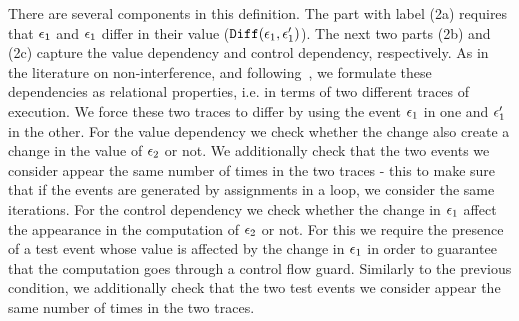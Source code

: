 There are several components in this definition. The part with label (2a) requires that $\mathtt{\epsilon}_1$ and $\mathtt{\epsilon}_1$ differ in their value ($\mathtt{Diff}(\mathtt{\epsilon}_1, \mathtt{\epsilon}_1')$).
The next two parts (2b) and (2c) capture the value dependency and control dependency, respectively.
As in the literature on non-interference, and following~\cite{Cousot19a}, we formulate these dependencies as relational properties, i.e. in terms of two different traces of execution. 
We force these two traces to differ by using the event $\mathtt{\epsilon}_1$ in one and $\mathtt{\epsilon}_1'$ in the other. 
For the value dependency we check whether the change also create a change in the value of $\mathtt{\epsilon}_2$ or not. We additionally check that the two events we consider appear the same number of times in the two traces - this to make sure that if the events are generated by assignments in a loop, we consider the same iterations. 
For the control dependency we check whether the change in $\mathtt{\epsilon}_1$ affect the appearance in the computation of $\mathtt{\epsilon}_2$ or not. 
For this we require the presence of a test event whose value is affected by the change in $\mathtt{\epsilon}_1$
in order to guarantee that the computation goes through a control flow guard.
Similarly to the previous condition, we additionally check that the two test events we consider appear the same number of times in the two traces.
% 


